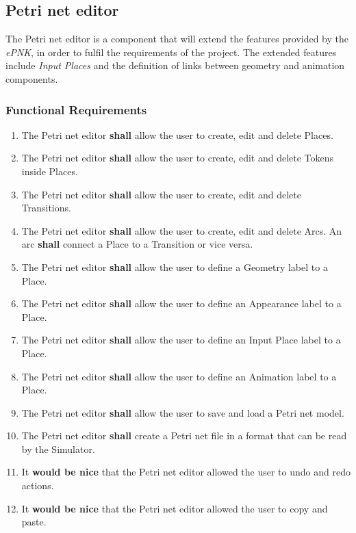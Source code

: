 \subsection{Petri net editor}

The Petri net editor is a component that will extend the features provided by the \textit{ePNK}, in order to fulfil the requirements of the project. The extended features include \textit{Input Places} and the definition of links between geometry and animation components.

\subsubsection{Functional Requirements}

\begin{enumerate}
	\item The Petri net editor \textbf{shall} allow the user to create, edit and delete Places.
	\item The Petri net editor \textbf{shall} allow the user to create, edit and delete Tokens inside Places.
	\item The Petri net editor \textbf{shall} allow the user to create, edit and delete Transitions.
	\item The Petri net editor \textbf{shall} allow the user to create, edit and delete Arcs. An arc \textbf{shall} connect a Place to a Transition or vice versa.
	\item The Petri net editor \textbf{shall} allow the user to define a Geometry label to a Place.
	\item The Petri net editor \textbf{shall} allow the user to define an Appearance label to a Place.
	\item The Petri net editor \textbf{shall} allow the user to define an Input Place label to a Place.
	\item The Petri net editor \textbf{shall} allow the user to define an Animation label to a Place.
	\item The Petri net editor \textbf{shall} allow the user to save and load a Petri net model.
	\item The Petri net editor \textbf{shall} create a Petri net file in a format that can be read by the Simulator.
	\item It \textbf{would be nice} that the Petri net editor allowed the user to undo and redo actions.
	\item It \textbf{would be nice} that the Petri net editor allowed the user to copy and paste.
\end{enumerate}

